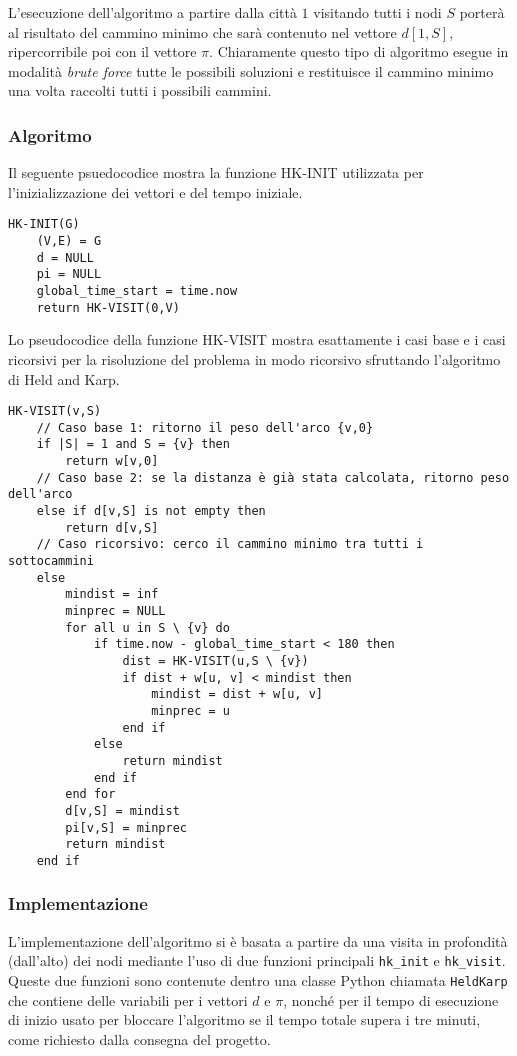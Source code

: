 L'esecuzione dell'algoritmo a partire dalla città \(1\) visitando tutti i nodi \(S\) porterà al risultato del cammino minimo che sarà contenuto nel vettore \(d[1, S]\), ripercorribile poi con il vettore \(\pi\). Chiaramente questo tipo di algoritmo esegue in modalità \textit{brute force} tutte le possibili soluzioni e restituisce il cammino minimo una volta raccolti tutti i possibili cammini.

\subsubsection{Algoritmo}

Il seguente psuedocodice mostra la funzione HK-INIT utilizzata per l'inizializzazione dei vettori e del tempo iniziale. 
\begin{verbatim}
HK-INIT(G)
    (V,E) = G
    d = NULL
    pi = NULL
    global_time_start = time.now
    return HK-VISIT(0,V)
\end{verbatim}    

Lo pseudocodice della funzione HK-VISIT mostra esattamente i casi base e i casi ricorsivi per la risoluzione del problema in modo ricorsivo sfruttando l'algoritmo di Held and Karp.
\begin{verbatim}
HK-VISIT(v,S)
    // Caso base 1: ritorno il peso dell'arco {v,0}
    if |S| = 1 and S = {v} then 
        return w[v,0]
    // Caso base 2: se la distanza è già stata calcolata, ritorno peso dell'arco
    else if d[v,S] is not empty then 
        return d[v,S]
    // Caso ricorsivo: cerco il cammino minimo tra tutti i sottocammini
    else
        mindist = inf
        minprec = NULL
        for all u in S \ {v} do
            if time.now - global_time_start < 180 then
                dist = HK-VISIT(u,S \ {v})
                if dist + w[u, v] < mindist then
                    mindist = dist + w[u, v]
                    minprec = u
                end if
            else
                return mindist
            end if
        end for
        d[v,S] = mindist
        pi[v,S] = minprec
        return mindist
    end if
\end{verbatim}


\subsubsection{Implementazione}

L'implementazione dell'algoritmo si è basata a partire da una visita in profondità (dall'alto) dei nodi mediante l'uso di due funzioni principali \texttt{hk\_init} e \texttt{hk\_visit}. Queste due funzioni sono contenute dentro una classe Python chiamata \texttt{HeldKarp} che contiene delle variabili per i vettori \(d\) e \(\pi\), nonché per il tempo di esecuzione di inizio usato per bloccare l'algoritmo se il tempo totale supera i tre minuti, come richiesto dalla consegna del progetto.

